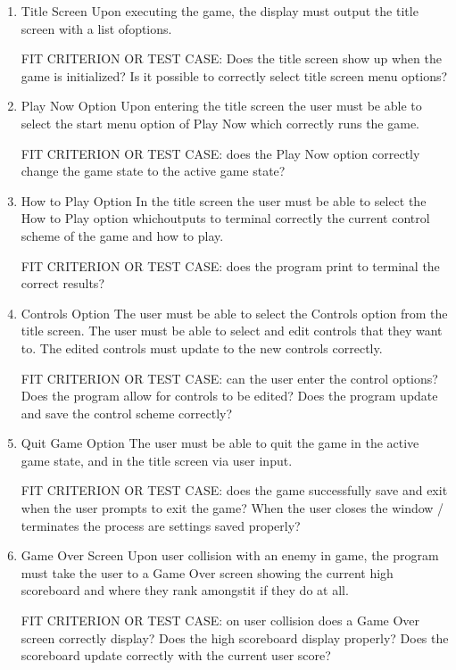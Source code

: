 \documentclass[12pt, titlepage]{article}
\begin{document}
\begin{enumerate}
\item Title Screen 
Upon executing the game, the display must output the title screen with a list
ofoptions.

FIT CRITERION OR TEST CASE: Does the title screen show up when the game is
initialized? Is it possible to correctly select title screen menu options?


\item Play Now Option
Upon entering the title screen the user must be able to select the start menu
option of Play Now which correctly runs the game.

FIT CRITERION OR TEST CASE: does the Play Now option correctly change the game
state to the active game state?


\item How to Play Option
In the title screen the user must be able to select the How to Play option
whichoutputs to terminal correctly the current control scheme of the game and
how to play.

FIT CRITERION OR TEST CASE: does the program print to terminal the correct
results?

\item Controls Option
The user must be able to select the Controls option from the title screen. The
user must be able to select and edit controls that they want to. The edited
controls must update to the new controls correctly.

FIT CRITERION OR TEST CASE: can the user enter the control options? Does the
program allow for controls to be edited? Does the program update and save the
control scheme correctly?


\item Quit Game Option
The user must be able to quit the game in the active game state, and in the
title screen via user input.

FIT CRITERION OR TEST CASE: does the game successfully save and exit when the
user prompts to exit the game? When the user closes the window / terminates the
process are settings saved properly?


\item Game Over Screen
Upon user collision with an enemy in game, the program must take the user to a
Game Over screen showing the current high scoreboard and where they rank
amongstit if they do at all.

FIT CRITERION OR TEST CASE: on user collision does a Game Over screen correctly
display? Does the high scoreboard display properly? Does the scoreboard update
correctly with the current user score?



\end{enumerate}
\end{document}
